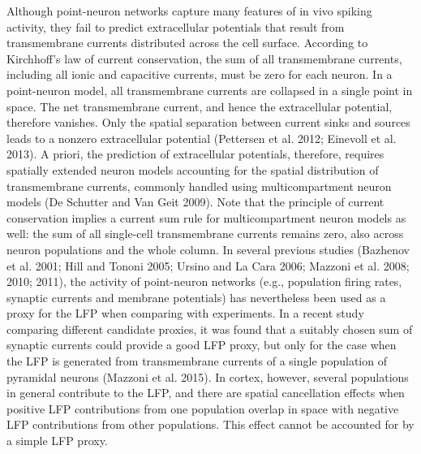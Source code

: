 Although point-neuron networks capture many features of
in vivo spiking activity, they fail to predict extracellular potentials that result from transmembrane currents distributed
across the cell surface. According to Kirchhoff’s law of current conservation, the sum of all transmembrane currents, including all ionic and capacitive currents, must be zero for each neuron. In a point-neuron model, all transmembrane currents are
collapsed in a single point in space. The net transmembrane
current, and hence the extracellular potential, therefore
vanishes. Only the spatial separation between current sinks
and sources leads to a nonzero extracellular potential
(Pettersen et al. 2012; Einevoll et al. 2013). A priori, the prediction of extracellular potentials, therefore, requires spatially
extended neuron models accounting for the spatial distribution
of transmembrane currents, commonly handled using multicompartment neuron models (De Schutter and Van Geit 2009).
Note that the principle of current conservation implies a current sum rule for multicompartment neuron models as well:
the sum of all single-cell transmembrane currents remains
zero, also across neuron populations and the whole column. In
several previous studies (Bazhenov et al. 2001; Hill and Tononi
2005; Ursino and La Cara 2006; Mazzoni et al. 2008; 2010; 2011),
the activity of point-neuron networks (e.g., population firing
rates, synaptic currents and membrane potentials) has nevertheless been used as a proxy for the LFP when comparing with
experiments. In a recent study comparing different candidate
proxies, it was found that a suitably chosen sum of synaptic
currents could provide a good LFP proxy, but only for the case
when the LFP is generated from transmembrane currents of a
single population of pyramidal neurons (Mazzoni et al. 2015). In
cortex, however, several populations in general contribute to
the LFP, and there are spatial cancellation effects when positive
LFP contributions from one population overlap in space with
negative LFP contributions from other populations. This effect
cannot be accounted for by a simple LFP proxy.

